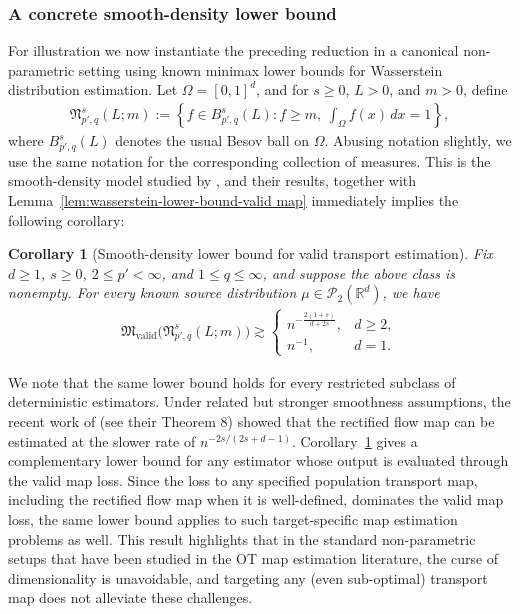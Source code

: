 \documentclass[11pt,twoside]{article}
\newtheorem{corollary}{Corollary}
\newcommand{\targetclass}{\mathfrak{N}}
\newcommand{\validminimaxrisk}{\mathfrak{M}_{\text{valid}}}
\begin{document}
\subsubsection*{A concrete smooth-density lower bound}
For illustration we now instantiate the preceding reduction in a canonical non-parametric setting using known minimax lower bounds for Wasserstein distribution estimation. Let $\Omega=[0,1]^d$, and for $s\geq0$, $L>0$, and $m>0$, define
\begin{align*}
\targetclass^s_{p',q}(L;m)
:=
\left\{
 f\in B^s_{p',q}(L):
 f\geq m,\ \int_\Omega f(x)\,dx=1
\right\},
\end{align*}
where $B^s_{p',q}(L)$ denotes the usual Besov ball on $\Omega$. Abusing notation slightly, we use the same notation for the corresponding collection of measures.
This is the smooth-density model studied by \citet{weed2019a}, and their results, together with Lemma~\ref{lem:wasserstein-lower-bound-valid map} immediately implies the following corollary: 
\begin{corollary}[Smooth-density lower bound for valid transport estimation]
\label{cor:smooth-density-valid map-lower-bound}
Fix $d\geq1$, $s\geq0$, $2\leq p'<\infty$, and $1\leq q\leq\infty$, and suppose the above class is nonempty. For every known source distribution $\mu\in\mathcal P_2(\mathbb R^d)$, 
we have 
\begin{align}
\label{eq:smooth-density-valid map-lower-bound}
\validminimaxrisk\bigl(\targetclass^s_{p',q}(L;m)\bigr)
\gtrsim
\begin{cases}
 n^{-\frac{2(1+s)}{d+2s}}, & d\geq2,\\[.5em]
 n^{-1}, & d=1.
\end{cases}
\end{align}
\end{corollary}
\noindent We note that the same lower bound holds for every restricted subclass of deterministic estimators.
Under related but stronger smoothness assumptions, the recent work of \citet{mena2025statistical} (see their Theorem 8) showed that the rectified flow map can be estimated 
at the slower rate of $n^{-2s/(2s + d - 1)}$. 
Corollary~\ref{cor:smooth-density-valid map-lower-bound} 
gives a complementary lower bound for any estimator whose output is evaluated through the valid map loss. Since the loss to any specified population transport map, including the rectified flow map when it is well-defined, dominates the valid map loss, the same lower bound applies to such target-specific map estimation problems as well.
This result highlights that in the standard non-parametric setups that have been studied in the OT map estimation literature, the curse of dimensionality is unavoidable, and targeting any (even sub-optimal) transport map does not alleviate these challenges.
\end{document}
